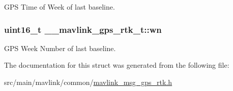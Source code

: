G\+P\+S Time of Week of last baseline. 

\hypertarget{struct____mavlink__gps__rtk__t_a20e9a0be6eb85fbc446f58348742bf24}{
\subsubsection[{wn}]{\setlength{\rightskip}{0pt plus 5cm}uint16\+\_\+t \+\_\+\+\_\+mavlink\+\_\+gps\+\_\+rtk\+\_\+t\+::wn}}\label{struct____mavlink__gps__rtk__t_a20e9a0be6eb85fbc446f58348742bf24}


G\+P\+S Week Number of last baseline. 



The documentation for this struct was generated from the following file\+:\begin{DoxyCompactItemize}
\item 
src/main/mavlink/common/\hyperlink{mavlink__msg__gps__rtk_8h}{mavlink\+\_\+msg\+\_\+gps\+\_\+rtk.\+h}\end{DoxyCompactItemize}
